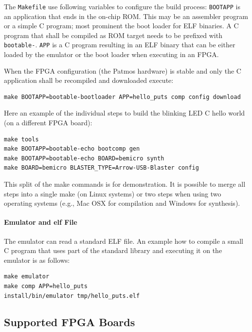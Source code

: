 \documentclass[a4paper,fontsize=10pt,twoside,DIV15,BCOR12mm,headinclude=true,footinclude=false,pagesize,bibtotoc]{scrbook}
\newcommand{\code}[1]{{\texttt{#1}}}
\newcommand{\comment}[3]{

\textsf{\textbf{#1}} {\color{#3}#2}}
\newcommand{\martin}[1]{\comment{Martin}{#1}{Blue}}
\renewcommand{\martin}[1]{}
\begin{document}
The \code{Makefile} use following variables to configure the build process:
\code{BOOTAPP} is an application that ends in the on-chip ROM. This may
be an assembler program or a simple C program;
most prominent the boot loader for ELF binaries.
A C program that shall be compiled as ROM target needs to be prefixed
with \code{bootable-}.
\code{APP} is a C program resulting in an ELF binary that can be either
loaded by the emulator or the boot loader when executing in an FPGA.

When the FPGA configuration (the Patmos hardware) is stable and only
the C application shall be recompiled and downloaded execute:

\begin{verbatim}
make BOOTAPP=bootable-bootloader APP=hello_puts comp config download
\end{verbatim}

Here an example of the individual steps to build the blinking LED C
hello world (on a different FPGA board):
\begin{verbatim}
make tools
make BOOTAPP=bootable-echo bootcomp gen
make BOOTAPP=bootable-echo BOARD=bemicro synth
make BOARD=bemicro BLASTER_TYPE=Arrow-USB-Blaster config
\end{verbatim}

This split of the make commands is for demonstration. It is
possible to merge all steps into a single make (on Linux
systems) or two steps when using two operating
systems (e.g., Mac OSX for compilation and Windows for synthesis).

\paragraph{Emulator and elf File}

The emulator can read a standard ELF file. An example how to compile
a small C program that uses part of the standard library and executing
it on the emulator is as follows:

\begin{verbatim}
make emulator
make comp APP=hello_puts
install/bin/emulator tmp/hello_puts.elf
\end{verbatim}

\martin{Where is the make target to run the emulator with an ELF file?}

\subsection{Supported FPGA Boards}
\end{document}
